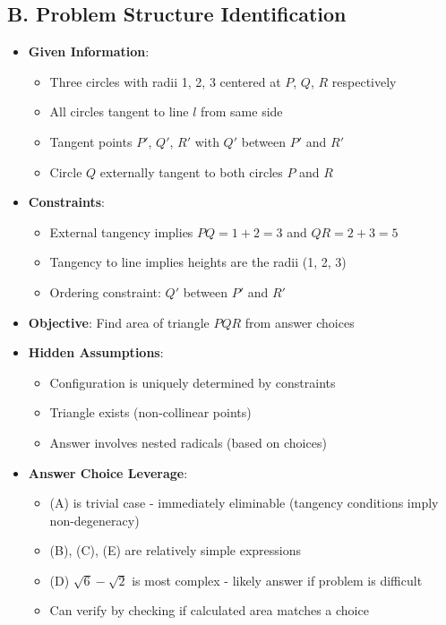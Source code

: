 \documentclass[]{article}
\begin{document}
\begin{problemconfigbox}
\subsection*{B. Problem Structure Identification}
\begin{itemize}[leftmargin=*]
    \item \textbf{Given Information}: 
    \begin{itemize}
        \item Three circles with radii 1, 2, 3 centered at $P$, $Q$, $R$ respectively
        \item All circles tangent to line $l$ from same side
        \item Tangent points $P'$, $Q'$, $R'$ with $Q'$ between $P'$ and $R'$
        \item Circle $Q$ externally tangent to both circles $P$ and $R$
    \end{itemize}
    \item \textbf{Constraints}: 
    \begin{itemize}
        \item External tangency implies $PQ = 1 + 2 = 3$ and $QR = 2 + 3 = 5$
        \item Tangency to line implies heights are the radii (1, 2, 3)
        \item Ordering constraint: $Q'$ between $P'$ and $R'$
    \end{itemize}
    \item \textbf{Objective}: Find area of triangle $PQR$ from answer choices
    \item \textbf{Hidden Assumptions}: 
    \begin{itemize}
        \item Configuration is uniquely determined by constraints
        \item Triangle exists (non-collinear points)
        \item Answer involves nested radicals (based on choices)
    \end{itemize}
    \item \textbf{Answer Choice Leverage}: 
    \begin{itemize}
        \item (A) is trivial case - immediately eliminable (tangency conditions imply non-degeneracy)
        \item (B), (C), (E) are relatively simple expressions
        \item (D) $\sqrt{6} - \sqrt{2}$ is most complex - likely answer if problem is difficult
        \item Can verify by checking if calculated area matches a choice
    \end{itemize}
\end{itemize}


\end{problemconfigbox}
\end{document}

